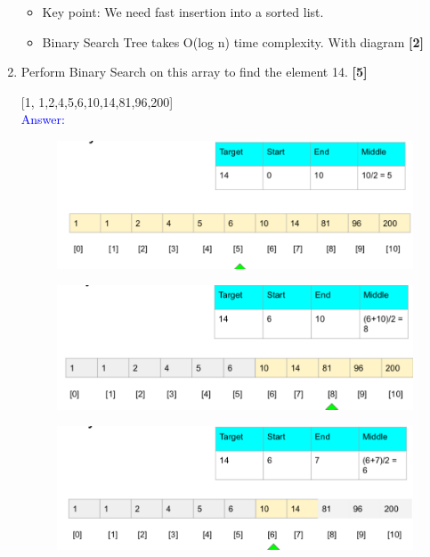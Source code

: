 \documentclass[12pt ,a4paper]{exam}
\begin{document}
\begin{enumerate}[start=1,label={\bfseries Q\arabic*)}]
\begin{itemize}
    		\item Key point: We need fast insertion into a sorted list.
    		\item Binary Search Tree takes O(log n) time complexity.  With diagram \hfill\textbf{[2]}\\    		
    	\end{itemize}
       \pagebreak
       \item Perform Binary Search on this array to find the element 14. \hfill\textbf{[5]}
       \item [] [1, 1,2,4,5,6,10,14,81,96,200]\\
       	\textcolor{blue}{Answer: } \\
       	\begin{figure}[h]
       		\centering
       		\includegraphics[width=0.7\linewidth]{"Screenshot 2020-12-27 at 10.32.15 PM"}
       		\caption{}
       		\label{fig:screenshot-2020-12-27-at-10}
       	\end{figure}
       	\begin{figure}[h]
       		\centering
       		\includegraphics[width=0.7\linewidth]{"Screenshot 2020-12-27 at 10.32.25 PM"}
       		\caption{}
       		\label{fig:screenshot-2020-12-27-at-10}
       	\end{figure}
       	\begin{figure}[h]
       		\centering
       		\includegraphics[width=0.7\linewidth]{"Screenshot 2020-12-27 at 10.32.34 PM"}
       		\caption{}
       		\label{fig:screenshot-2020-12-27-at-10}

\end{figure}
\end{enumerate}
\end{document}
